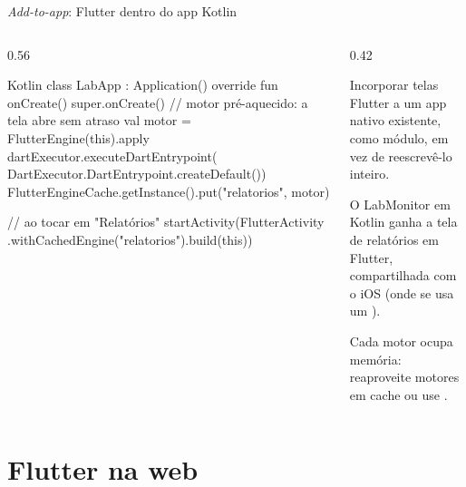 \documentclass[aspectratio=169,10pt]{beamer}
\begin{document}
\begin{frame}[fragile]{\emph{Add-to-app}: Flutter dentro do app Kotlin}
  \begin{columns}[T]
    \begin{column}{0.56\textwidth}
\begin{codigo}[title=App Android nativo (Kotlin)]{Kotlin}
class LabApp : Application() {
  override fun onCreate() {
    super.onCreate()
    // motor pré-aquecido: a tela abre sem atraso
    val motor = FlutterEngine(this).apply {
      dartExecutor.executeDartEntrypoint(
        DartExecutor.DartEntrypoint.createDefault())
    }
    FlutterEngineCache.getInstance().put("relatorios", motor)
  }
}

// ao tocar em "Relatórios"
startActivity(FlutterActivity
    .withCachedEngine("relatorios").build(this))
\end{codigo}
    \end{column}
    \begin{column}{0.42\textwidth}
      \begin{definicao}
        Incorporar telas Flutter a um app nativo existente, como módulo, em vez de reescrevê-lo inteiro.
      \end{definicao}
      \begin{conceito}[Cenário]
        O LabMonitor em Kotlin ganha a tela de relatórios em Flutter, compartilhada com o iOS (onde se usa um ).
      \end{conceito}
      \begin{atencao}
        Cada motor ocupa memória: reaproveite motores em cache ou use .
      \end{atencao}
    \end{column}
  \end{columns}
\end{frame}

\section{Flutter na web}
\end{document}
